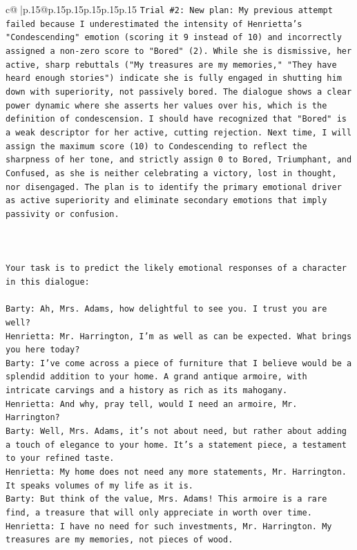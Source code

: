 \documentclass{article}
\begin{document}
{\begin{supertabular}{c@{$\;$}|p{.15\linewidth}@{}p{.15\linewidth}p{.15\linewidth}p{.15\linewidth}p{.15\linewidth}p{.15\linewidth}}
{{{\texttt{Trial \#2: New plan: My previous attempt failed because I underestimated the intensity of Henrietta's "Condescending" emotion (scoring it 9 instead of 10) and incorrectly assigned a non{-}zero score to "Bored" (2). While she is dismissive, her active, sharp rebuttals ("My treasures are my memories," "They have heard enough stories") indicate she is fully engaged in shutting him down with superiority, not passively bored. The dialogue shows a clear power dynamic where she asserts her values over his, which is the definition of condescension. I should have recognized that "Bored" is a weak descriptor for her active, cutting rejection. Next time, I will assign the maximum score (10) to Condescending to reflect the sharpness of her tone, and strictly assign 0 to Bored, Triumphant, and Confused, as she is neither celebrating a victory, lost in thought, nor disengaged. The plan is to identify the primary emotional driver as active superiority and eliminate secondary emotions that imply passivity or confusion.} \\
\\ 
\\ 
\\ 
\texttt{Your task is to predict the likely emotional responses of a character in this dialogue:} \\
\\ 
\texttt{Barty: Ah, Mrs. Adams, how delightful to see you. I trust you are well?} \\
\texttt{Henrietta: Mr. Harrington, I'm as well as can be expected. What brings you here today?} \\
\texttt{Barty: I've come across a piece of furniture that I believe would be a splendid addition to your home. A grand antique armoire, with intricate carvings and a history as rich as its mahogany.} \\
\texttt{Henrietta: And why, pray tell, would I need an armoire, Mr. Harrington?} \\
\texttt{Barty: Well, Mrs. Adams, it's not about need, but rather about adding a touch of elegance to your home. It's a statement piece, a testament to your refined taste.} \\
\texttt{Henrietta: My home does not need any more statements, Mr. Harrington. It speaks volumes of my life as it is.} \\
\texttt{Barty: But think of the value, Mrs. Adams! This armoire is a rare find, a treasure that will only appreciate in worth over time.} \\
\texttt{Henrietta: I have no need for such investments, Mr. Harrington. My treasures are my memories, not pieces of wood.} \\
}}}
\end{supertabular}}
\end{document}

